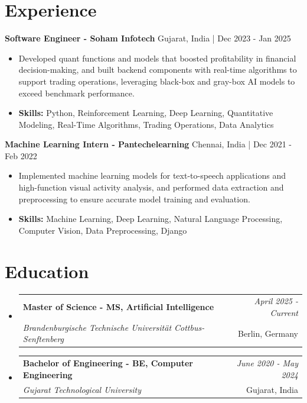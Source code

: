 \documentclass[a4paper,11pt]{article}
\makeatletter
\newcommand{\resumeSubheading}[4]{
\vspace{0.5mm}\item
    \begin{tabular*}{\linewidth}[t]{l@{\extracolsep{\fill}}r}
        \textbf{#1} & \textit{\footnotesize{#4}} \\
        \textit{\footnotesize{#3}} &  \footnotesize{#2}\\
    \end{tabular*}
    \vspace{-2.4mm}
}
\makeatother
\begin{document}
\section{\textbf{Experience}}


\vspace{1mm}
  \textbf{Software Engineer - Soham Infotech} \hfill Gujarat, India | Dec 2023 - Jan 2025
\vspace{-1.5mm} %
\begin{itemize}
  \item Developed quant functions and models that boosted profitability in financial decision-making, and built backend components with real-time algorithms to support trading operations, leveraging black-box and gray-box AI models to exceed benchmark performance.

\vspace{-2mm}
  \item \textbf{Skills:} Python, Reinforcement Learning, Deep Learning, Quantitative Modeling, Real-Time Algorithms, Trading Operations, Data Analytics
\end{itemize}

\vspace{1mm}
  \textbf{Machine Learning Intern - Pantechelearning} \hfill Chennai, India | Dec 2021 - Feb 2022
\vspace{-1.5mm} %
\begin{itemize}
  \item Implemented machine learning models for text-to-speech applications and high-function visual activity analysis, and performed data extraction and preprocessing to ensure accurate model training and evaluation.
\vspace{-2mm}
  \item \textbf{Skills:} Machine Learning, Deep Learning, Natural Language Processing, Computer Vision, Data Preprocessing, Django
\end{itemize}\section{\textbf{Education}}
\vspace{-0.4mm}

\begin{itemize}[leftmargin=0.15in, label={}]
\resumeSubheading
{Master of Science - MS, Artificial Intelligence }{Berlin, Germany}
{Brandenburgische Technische Universität Cottbus-Senftenberg  }{April 2025 - Current}

\vspace{1.0mm} %
\resumeSubheading
{Bachelor of Engineering - BE, Computer Engineering  }{Gujarat, India}
{Gujarat Technological University }{June 2020 - May 2024}

\end{itemize}
\end{document}
